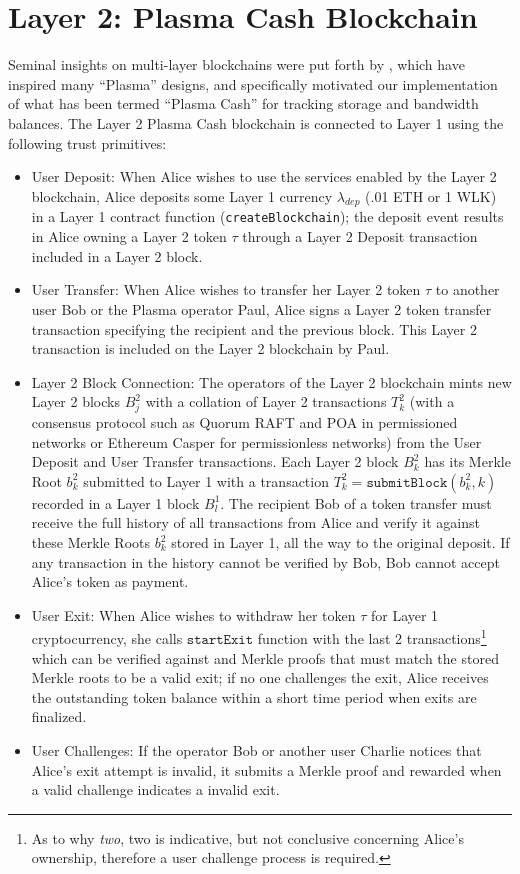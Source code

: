 \documentclass{article}
\newcommand{\block}[2]{B^{#1}_{#2}}
\newcommand{\blockhash}[2]{b^{#1}_{#2}}
\newcommand{\transaction}[2]{T_{#2}^#1}
\newcommand{\submitblock}[2]{\texttt{submitBlock}(#2, #1)}
\newcommand{\startexit}{\texttt{startExit}}
\begin{document}
\section{Layer 2: Plasma Cash Blockchain}

Seminal insights on multi-layer blockchains were put forth by \cite{poonbuterin2017}, which have inspired many ``Plasma'' designs, and specifically motivated our implementation of what has been termed ``Plasma Cash'' for tracking storage and  bandwidth balances.  The Layer 2 Plasma Cash blockchain is connected to Layer 1 using the following trust primitives:
\begin{itemize}
\item User Deposit: When Alice wishes to use the services enabled by the Layer 2 blockchain, Alice deposits some Layer 1 currency $\lambda_{dep}$ (.01 ETH or 1 WLK) in a Layer 1 contract function (\texttt{createBlockchain}); the deposit event results in Alice owning a Layer 2 token $\tau$ through a Layer 2 Deposit transaction included in a Layer 2 block.

\item User Transfer: When Alice wishes to transfer her Layer 2 token $\tau$ to another user Bob or the Plasma operator Paul, Alice signs a Layer 2 token transfer transaction specifying the recipient and the previous block.  This Layer 2 transaction is included on the Layer 2 blockchain by Paul.

\item Layer 2 Block Connection: The operators of the Layer 2 blockchain mints new Layer 2 blocks $\block{2}{j}$ with a collation of Layer 2 transactions $\transaction{2}{k}$ (with a consensus protocol such as Quorum RAFT and POA in permissioned networks or Ethereum Casper for permissionless networks) from the User Deposit and User Transfer transactions.  Each Layer 2 block $\block{2}{k}$ has its Merkle Root $\blockhash{2}{k}$ submitted to Layer 1 with a transaction $\transaction{2}{k} = \submitblock{k}{\blockhash{2}{k}}$ recorded in a Layer 1 block $\block{1}{l}$.   The recipient Bob of a token transfer must receive the full history of all transactions from Alice and verify it against these Merkle Roots $\blockhash{2}{k}$ stored in Layer 1, all the way to the original deposit.  If any transaction in the history cannot be verified by Bob, Bob cannot accept Alice's token as payment.

\item User Exit: When Alice wishes to withdraw her token $\tau$ for Layer 1 cryptocurrency, she calls $\startexit$ function with the last 2 transactions\footnote{As to why {\em two}, two is indicative, but not conclusive concerning Alice's ownership, therefore a user challenge process is required.} which can be verified against and Merkle proofs that must match the stored Merkle roots to be a valid exit; if no one challenges the exit, Alice receives the outstanding token balance within a short time period when exits are finalized.

\item User Challenges:  If the operator Bob or another user Charlie notices that Alice's exit attempt is invalid, it submits a Merkle proof and rewarded when a valid challenge indicates a invalid exit.
\end{itemize}
\end{document}
